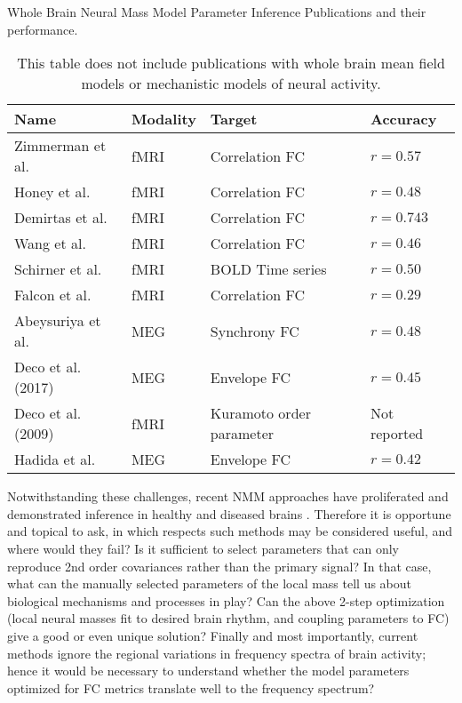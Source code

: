 \begin{table}
 \caption{Whole Brain Neural Mass Model Parameter Inference Publications and their performance.}
 \caption*{This table does not include publications with whole brain mean field models or mechanistic models of neural activity.}
  \centering
  \begin{tabular*}{\textwidth}{llll}
    \toprule
    \cmidrule(r){1-2}
    Name & Modality  & Target  & Accuracy \\
    \midrule
    Zimmerman et al. \cite{Zimmermann2018} & fMRI & Correlation FC & $r=0.57$  \\
    Honey et al. \cite{honey_predicting_2009} & fMRI & Correlation FC & $ r=0.48$ \\
    Demirtas et al. \cite{demirtas_hierarchical_2019} & fMRI & Correlation FC & $r=0.743$ \\
    Wang et al. \cite{wang_inversion_2019} & fMRI & Correlation FC & $r=0.46$ \\
    Schirner et al. \cite{schirner_inferring_2018} & fMRI & BOLD Time series & $r=0.50$ \\
    Falcon et al. \cite{falcon_virtual_2015} & fMRI  & Correlation FC  &  $r = 0.29$  \\
    Abeysuriya et al. \cite{abeysuriya_biophysical_2018} & MEG & Synchrony FC & $r = 0.48$ \\
    Deco et al. (2017) \cite{deco_single_2017}  & MEG & Envelope FC & $r=0.45$ \\
    Deco et al. (2009) \cite{Deco2009} & fMRI & Kuramoto order parameter & Not reported \\
    Hadida et al. \cite{hadida_bayesian_2018} & MEG & Envelope FC & $r=0.42$ \\
    \bottomrule
  \end{tabular*}
  \label{tab:nmm_pubs}
\end{table}

Notwithstanding these challenges, recent NMM approaches have proliferated and demonstrated inference in healthy and diseased brains \cite{honey_dynamical_2008,alstott_modeling_2009,haan_activity_2012,yang_functional_2016,Zimmermann2018,singh_estimation_2020}. Therefore it is opportune and topical to ask, in which respects such methods may be considered useful, and where would they fail? Is it sufficient to select parameters that can only reproduce 2nd order covariances rather than the primary signal? In that case, what can the manually selected parameters of the local mass tell us about biological mechanisms and processes in play? Can the above 2-step optimization (local neural masses fit to desired brain rhythm, and coupling parameters to FC) give a good or even unique solution? Finally and most importantly, current methods ignore the regional variations in frequency spectra of brain activity; hence it would be necessary to understand whether the model parameters optimized for FC metrics translate well to the frequency spectrum?

